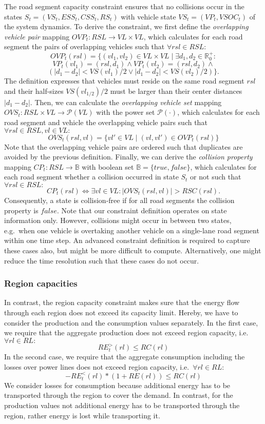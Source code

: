 The road segment capacity constraint ensures that no collisions occur in the states $S_t = (VS_t, ESS_t, CSS_t, RS_t)$ with vehicle state $VS_t = (VP_t, VSOC_t)$ of the system dynamics. To derive the constraint, we first define the \textit{overlapping vehicle pair} mapping $OVP_t : RSL \rightarrow VL \times VL$, which calculates for each road segment the pairs of overlapping vehicles such that $\forall rsl \in RSL:$
\[
	OVP_t(rsl) = \{(vl_1, vl_2) \in VL \times VL \mid \exists d_1, d_2 \in \mathbb{R}_0^+:
\]
\[
	VP_t(vl_1) = (rsl, d_1) \wedge VP_t(vl_2) = (rsl, d_2) \wedge
\]
\[
	(|d_1 - d_2| < VS(vl_1) / 2 \vee |d_1 - d_2| < VS(vl_2) / 2) \} \textrm{.}
\]
The definition expresses that vehicles must reside on the same road segment $rsl$ and their half-sizes $VS(vl_{1/2}) / 2$ must be larger than their center distances $|d_1 - d_2|$. Then, we can calculate the \textit{overlapping vehicle set} mapping $OVS_t : RSL \times VL \rightarrow \mathcal{P}(VL)$ with the power set $\mathcal{P}(\cdot)$, which calculates for each road segment and vehicle the overlapping vehicle pairs such that $\forall rsl \in RSL, vl \in VL:$
\[
	OVS_t(rsl,vl) = \{vl' \in VL \mid (vl, vl') \in OVP_t(rsl)\}
\]
Note that the overlapping vehicle pairs are ordered such that duplicates are avoided by the previous definition. Finally, we can derive the \textit{collision property} mapping $CP_t : RSL \rightarrow \mathbb{B}$ with boolean set $\mathbb{B} = \{true, false\}$, which calculates for each road segment whether a collision occurred in state $S_t$ or not such that $\forall rsl \in RSL:$
\[
	CP_t(rsl) \Leftrightarrow \exists vl \in VL : |OVS_t(rsl, vl)| > RSC(rsl) \textrm{.}
\]
Consequently, a state is collision-free if for all road segments the collision property is $false$. Note that our constraint definition operates on state information only. However, collisions might occur in between two states, e.g.\ when one vehicle is overtaking another vehicle on a single-lane road segment within one time step. An advanced constraint definition is required to capture these cases also, but might be more difficult to compute. Alternatively, one might reduce the time resolution such that these cases do not occur.

\subsubsection{Region capacities}
\label{capacities}

In contrast, the region capacity constraint makes sure that the energy flow through each region does not exceed its capacity limit. Hereby, we have to consider the production and the consumption values separately. In the first case, we require that the aggregate production does not exceed region capacity, i.e.\ $\forall rl \in RL:$
\[
	RE_t^>(rl) \leq RC(rl)
\]
In the second case, we require that the aggregate consumption including the losses over power lines does not exceed region capacity, i.e.\ $\forall rl \in RL:$
\[
	- RE_t^<(rl) * (1 + RE(rl)) \leq RC(rl)
\]
We consider losses for consumption because additional energy has to be transported through the region to cover the demand. In contrast, for the production values not additional energy has to be transported through the region, rather energy is lost while transporting it.

